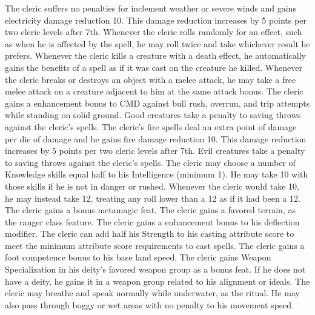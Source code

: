  The cleric suffers no penalties for inclement weather or severe winds and gains electricity damage reduction 10. This damage reduction increases by 5 points per two cleric levels after 7th.
 Whenever the cleric rolls randomly for an effect, such as when he is affected by the  spell, he may roll twice and take whichever result he prefers.
 Whenever the cleric kills a creature with a death effect, he automatically gains the benefits of a  spell as if it was cast on the creature he killed.
 Whenever the cleric breaks or destroys an object with a melee attack, he may take a free melee attack on a creature adjacent to him at the same attack bonus.
 The cleric gains a  enhancement bonus to CMD against bull rush, overrun, and trip attempts while standing on solid ground.
 Good creatures take a  penalty to saving throws against the cleric's spells.
 The cleric's fire spells deal an extra point of damage per die of damage and he gains fire damage reduction 10. This damage reduction increases by 5 points per two cleric levels after 7th.
 Evil creatures take a  penalty to saving throws against the cleric's spells.
 The cleric may choose a number of Knowledge skills equal half to his Intelligence (minimum 1). He may take 10 with those skills if he is not in danger or rushed.
 Whenever the cleric would take 10, he may instead take 12, treating any roll lower than a 12 as if it had been a 12.
 The cleric gains a bonus metamagic feat.
 The cleric gains a favored terrain, as the ranger class feature.
 The cleric gains a  enhancement bonus to his deflection modifier.
 The cleric can add half his Strength to his casting attribute score to meet the minimum attribute score requirements to cast spells.
 The cleric gains a  foot competence bonus to his base land speed.
 The cleric gains Weapon Specialization in his deity's favored weapon group as a bonus feat. If he does not have a deity, he gains it in a weapon group related to his alignment or ideals.
 The cleric may breathe and speak normally while underwater, as the  ritual. He may also pass through boggy or wet areas with no penalty to his movement speed.


